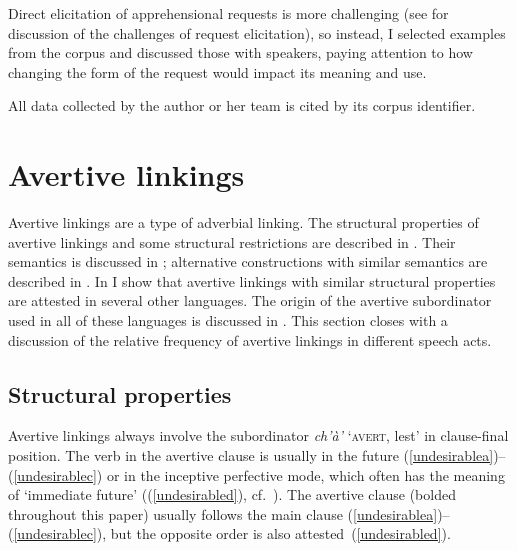 \documentclass[output=paper,colorlinks,citecolor=brown]{langscibook}
\begin{document}
Direct elicitation of apprehensional requests is more challenging (see \citealt{LovickO2016, LovickOTuttleS2019} for discussion of the challenges of request elicitation), so instead, I selected examples from the corpus and discussed those with speakers, paying attention to how changing the form of the request would impact its meaning and use. 

All data collected by the author or her team is cited by its corpus identifier.

\section{Avertive linkings}
\label{section:avertive}

Avertive linkings are a type of adverbial linking. The structural properties of avertive linkings and some structural restrictions are described in . Their semantics is discussed in ; alternative constructions with similar semantics are described in . In  I show that avertive linkings with similar structural properties are attested in several other  languages. The origin of the avertive subordinator used in all of these languages is discussed in . This section closes with a discussion of the relative frequency of avertive linkings in different speech acts.


\subsection{Structural properties}
\label{subsection:avertive-structure}

Avertive linkings always involve the subordinator \textit{ch'à'} `\textsc{avert}, lest' in clause-final position. The verb in the avertive clause is usually in the future (\ref{undesirablea})--(\ref{undesirablec}) or in the inceptive perfective mode, which often has the meaning of `immediate future' ((\ref{undesirabled}), cf.\  \citealt{LovickO2017}). The avertive clause (bolded throughout this paper) usually follows the main clause (\ref{undesirablea})--(\ref{undesirablec}), but the opposite order is also attested~(\ref{undesirabled}). 
\end{document}
